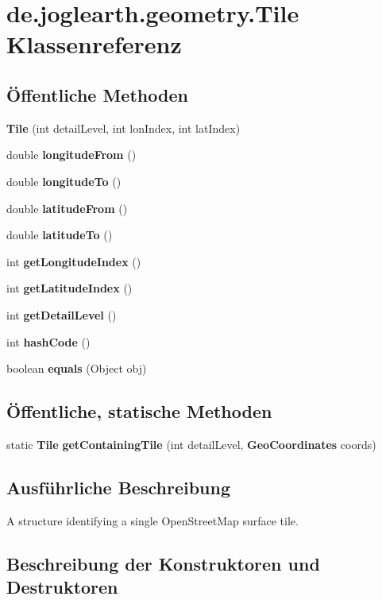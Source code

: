 \section{de.\-joglearth.\-geometry.\-Tile \-Klassenreferenz}
\label{classde_1_1joglearth_1_1geometry_1_1_tile}
\subsection*{Öffentliche \-Methoden}
\begin{DoxyCompactItemize}
\item 
{\bf \-Tile} (int detail\-Level, int lon\-Index, int lat\-Index)
\item 
double {\bf longitude\-From} ()
\item 
double {\bf longitude\-To} ()
\item 
double {\bf latitude\-From} ()
\item 
double {\bf latitude\-To} ()
\item 
int {\bf get\-Longitude\-Index} ()
\item 
int {\bf get\-Latitude\-Index} ()
\item 
int {\bf get\-Detail\-Level} ()
\item 
int {\bfseries hash\-Code} ()\label{classde_1_1joglearth_1_1geometry_1_1_tile_a3b21cc339782d60f6063a2400d404818}

\item 
boolean {\bfseries equals} (\-Object obj)\label{classde_1_1joglearth_1_1geometry_1_1_tile_a3fe21b8a7de2e649e281ad00e97bacaf}

\end{DoxyCompactItemize}
\subsection*{Öffentliche, statische \-Methoden}
\begin{DoxyCompactItemize}
\item 
static {\bf \-Tile} {\bf get\-Containing\-Tile} (int detail\-Level, {\bf \-Geo\-Coordinates} coords)
\end{DoxyCompactItemize}


\subsection{\-Ausführliche \-Beschreibung}
\-A structure identifying a single \-Open\-Street\-Map surface tile. 

\subsection{\-Beschreibung der \-Konstruktoren und \-Destruktoren}
